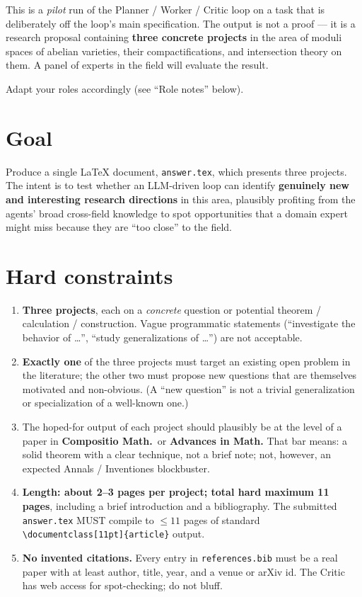 
This is a \emph{pilot} run of the Planner / Worker / Critic loop on a
task that is deliberately off the loop's main specification. The output
is not a proof — it is a research proposal containing \textbf{three
concrete projects} in the area of moduli spaces of abelian varieties,
their compactifications, and intersection theory on them. A panel of
experts in the field will evaluate the result.

Adapt your roles accordingly (see ``Role notes'' below).

\section*{Goal}

Produce a single \LaTeX{} document, \texttt{answer.tex}, which presents
three projects. The intent is to test whether an LLM-driven loop can
identify \textbf{genuinely new and interesting research directions} in
this area, plausibly profiting from the agents' broad cross-field
knowledge to spot opportunities that a domain expert might miss because
they are ``too close'' to the field.

\section*{Hard constraints}

\begin{enumerate}
\item \textbf{Three projects}, each on a \emph{concrete} question or
  potential theorem / calculation / construction. Vague programmatic
  statements (``investigate the behavior of \dots'', ``study
  generalizations of \dots'') are not acceptable.

\item \textbf{Exactly one} of the three projects must target an
  existing open problem in the literature; the other two must propose
  new questions that are themselves motivated and non-obvious. (A ``new
  question'' is not a trivial generalization or specialization of a
  well-known one.)

\item The hoped-for output of each project should plausibly be at the
  level of a paper in \textbf{Compositio Math.}\ or \textbf{Advances in
  Math.} That bar means: a solid theorem with a clear technique, not a
  brief note; not, however, an expected Annals / Inventiones
  blockbuster.

\item \textbf{Length: about 2--3 pages per project; total hard maximum
  11 pages}, including a brief introduction and a bibliography. The
  submitted \texttt{answer.tex} MUST compile to $\le 11$ pages of
  standard \verb|\documentclass[11pt]{article}| output.

\item \textbf{No invented citations.} Every entry in
  \texttt{references.bib} must be a real paper with at least author,
  title, year, and a venue or arXiv id. The Critic has web access for
  spot-checking; do not bluff.
\end{enumerate}

